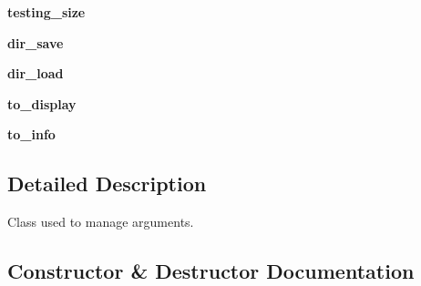 \begin{DoxyCompactItemize}
\item 
{\bfseries testing\+\_\+size}\hypertarget{classsrc_1_1argumentsManager_1_1ArgsManager_ab6597b54c4de67de859e4de289f1c1fd}{}\label{classsrc_1_1argumentsManager_1_1ArgsManager_ab6597b54c4de67de859e4de289f1c1fd}

\item 
{\bfseries dir\+\_\+save}\hypertarget{classsrc_1_1argumentsManager_1_1ArgsManager_ae90929ee5e318ea25bf91b5aa982c50c}{}\label{classsrc_1_1argumentsManager_1_1ArgsManager_ae90929ee5e318ea25bf91b5aa982c50c}

\item 
{\bfseries dir\+\_\+load}\hypertarget{classsrc_1_1argumentsManager_1_1ArgsManager_a5bdc876e034aedcfb694748171b2e24c}{}\label{classsrc_1_1argumentsManager_1_1ArgsManager_a5bdc876e034aedcfb694748171b2e24c}

\item 
{\bfseries to\+\_\+display}\hypertarget{classsrc_1_1argumentsManager_1_1ArgsManager_a0b499d8928cab35a455710a405c3295c}{}\label{classsrc_1_1argumentsManager_1_1ArgsManager_a0b499d8928cab35a455710a405c3295c}

\item 
{\bfseries to\+\_\+info}\hypertarget{classsrc_1_1argumentsManager_1_1ArgsManager_afc704dbe9aec6299e8068f2687f3060b}{}\label{classsrc_1_1argumentsManager_1_1ArgsManager_afc704dbe9aec6299e8068f2687f3060b}

\end{DoxyCompactItemize}


\subsection{Detailed Description}
\begin{DoxyVerb}    Class used to manage arguments.
\end{DoxyVerb}
 

\subsection{Constructor \& Destructor Documentation}
